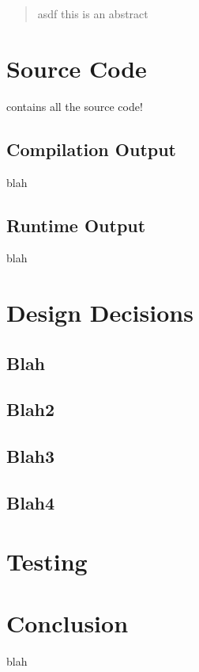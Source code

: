 \documentclass[12pt]{article}
\begin{document}
\maketitle

\begin{abstract}
asdf this is an abstract
\end{abstract}

\section{Source Code}
contains all the source code!

\subsection{Compilation Output}
blah

\subsection{Runtime Output}
blah

\section{Design Decisions}
\subsection{Blah}
\subsection{Blah2}
\subsection{Blah3}
\subsection{Blah4}

\section{Testing}

\section{Conclusion}
blah
\end{document}
